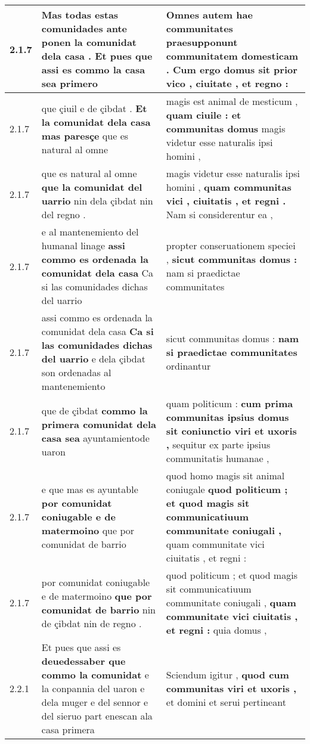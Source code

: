 \begin{tabular}{|p{1cm}|p{6.5cm}|p{6.5cm}|}
2.1.7 & Mas todas estas comunidades \textbf{ ante ponen la comunidat dela casa . } Et pues que assi es commo la casa sea primero & Omnes autem hae communitates \textbf{ praesupponunt communitatem domesticam . } Cum ergo domus sit prior vico , ciuitate , et regno : \\\hline
2.1.7 & que çiuil e de çibdat . \textbf{ Et la comunidat dela casa mas paresçe } que es natural al omne & magis est animal de mesticum , \textbf{ quam ciuile : et communitas domus } magis videtur esse naturalis ipsi homini , \\\hline
2.1.7 & que es natural al omne \textbf{ que la comunidat del uarrio } nin dela çibdat nin del regno . & magis videtur esse naturalis ipsi homini , \textbf{ quam communitas vici , ciuitatis , et regni . } Nam si considerentur ea , \\\hline
2.1.7 & e al mantenemiento del humanal linage \textbf{ assi commo es ordenada la comunidat dela casa } Ca si las comunidades dichas del uarrio & propter conseruationem speciei , \textbf{ sicut communitas domus : } nam si praedictae communitates \\\hline
2.1.7 & assi commo es ordenada la comunidat dela casa \textbf{ Ca si las comunidades dichas del uarrio } e dela çibdat son ordenadas al mantenemiento & sicut communitas domus : \textbf{ nam si praedictae communitates } ordinantur \\\hline
2.1.7 & que de çibdat \textbf{ commo la primera comunidat dela casa sea } ayuntamientode uaron & quam politicum : \textbf{ cum prima communitas ipsius domus sit coniunctio viri et uxoris , } sequitur ex parte ipsius communitatis humanae , \\\hline
2.1.7 & e que mas es ayuntable \textbf{ por comunidat coniugable e de matermoino } que por comunidat de barrio & quod homo magis sit animal coniugale \textbf{ quod politicum ; et quod magis sit communicatiuum communitate coniugali , } quam communitate vici ciuitatis , et regni : \\\hline
2.1.7 & por comunidat coniugable e de matermoino \textbf{ que por comunidat de barrio } nin de çibdat nin de regno . & quod politicum ; et quod magis sit communicatiuum communitate coniugali , \textbf{ quam communitate vici ciuitatis , et regni : } quia domus , \\\hline
2.2.1 & Et pues que assi es \textbf{ deuedessaber que commo la comunidat } e la conpannia del uaron e dela muger e del sennor e del sieruo part enescan ala casa primera & Sciendum igitur , \textbf{ quod cum communitas viri et uxoris , } et domini et serui pertineant \\\hline

\end{tabular}
